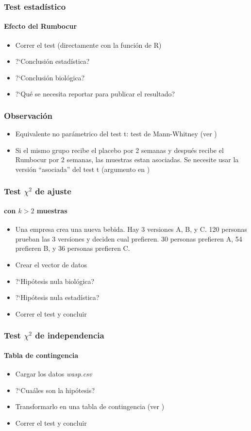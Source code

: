\documentclass[mathserif]{beamer}
\begin{document}
\begin{frame}[plain,label=d42]%
\frametitle{Test estad\'istico}
\framesubtitle{Efecto del Rumbocur}
\begin{itemize}
   \item Correr el test (directamente con la funci\'on de R)
   \item ?`Conclusi\'on estad\'istica?
   \item ?`Conclusi\'on biol\'ogica?
   \item ?`Qu\'e se necesita reportar para publicar el resultado?
\end{itemize}
\end{frame}%

\begin{frame}[plain,label=d43]%
\frametitle{Observaci\'on}
\begin{itemize}
   \item Equivalente no par\'ametrico del test t: test de Mann-Whitney (ver )
   \item Si el mismo grupo recibe el placebo por 2 semanas y despu\'es recibe el Rumbocur por 2 semanas, las muestras estan asociadas. Se necesite usar la versi\'on ``asociada'' del test t (argumento  en )
\end{itemize}
\end{frame}%

\begin{frame}[plain,label=d44]%
\frametitle{Test $\chi^2$ de ajuste}
\framesubtitle{con $k>2$ muestras}
\begin{itemize}
   \item Una empresa crea una nueva bebida. Hay 3 versiones A, B, y C. 120 personas prueban las 3 versiones y deciden cual prefieren. 30 personas prefieren A, 54 prefieren B, y 36 personas prefieren C.
   \item  Crear el vector de datos
   \item ?`Hip\'otesis nula biol\'ogica?
   \item ?`Hip\'otesis nula estad\'istica?
   \item Correr el test y concluir
\end{itemize}
\end{frame}%

\begin{frame}[plain,label=d45]%
\frametitle{Test $\chi^2$ de independencia}
\framesubtitle{Tabla de contingencia}
\begin{itemize}
   \item Cargar los datos \emph{wasp.csv}
   \item ?`Cua\'ales son la hip\'otesis?
   \item Transformarlo en una tabla de contingencia (ver )
   \item Correr el test y concluir
\end{itemize}
\end{frame}%
\end{document}
